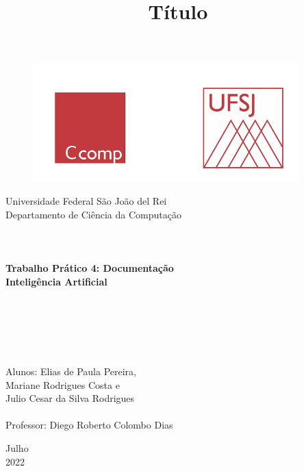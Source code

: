 \documentclass[a4paper, 12pt]{article}
\begin{document}
\begin{titlepage}
	\begin{center}
	
	\begin{figure}[ht]
    \centering
    \includegraphics[width=.44\textwidth]{Images/LogoUFSJ.PNG}
    \label{fig:Capturar.PNG}
    \end{figure}

    	\Huge{Universidade Federal São João del Rei}\\
		\Large{Departamento de Ciência da Computação}\\ 

        \vspace{110pt}
        \textbf{\LARGE{
        \\
        \\
        \\
        Trabalho Prático 4: Documentação\\
        \vspace{0.5cm}
        \Large{Inteligência Artificial}
        \\
        \\
        \\
        }}
        
		\title{{\large{Título}}}
		\vspace{1cm}
	\end{center}
	    
    \begin{flushleft}
		\begin{tabbing}
		\\
		\\
		\\	
		\large{Alunos: Elias de Paula Pereira,}\\ 
		\large{\hspace{1.9cm}Mariane Rodrigues Costa e}\\
		\large{\hspace{1.9cm}Julio Cesar da Silva Rodrigues}
		\\
	    \\
		\large{Professor: Diego Roberto Colombo Dias}\\
	    \end{tabbing}
    \end{flushleft}
	\vspace{0.85cm}
	
	\begin{center}
		\vspace{\fill}
			Julho\\
		    2022
	\end{center}
\end{titlepage}
\end{document}
